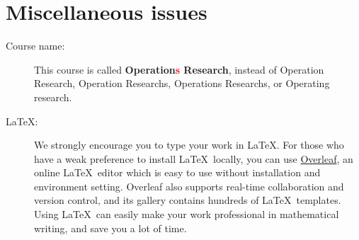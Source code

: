 \documentclass{OR_SolutionTheme}
\begin{document}
\section{Miscellaneous issues}\label{sec:misc}
\begin{description}
    \item[Course name:] This course is called {\bf Operation\textcolor{red}{s} Research},
    instead of Operation Research, Operation Researchs, Operations Researchs, or
    Operating research.
    
    \item[\LaTeX:]
    We strongly encourage you to type your work in \LaTeX.
    For those who have a weak preference to install \LaTeX \ locally,
    you can use \href{https://www.overleaf.com/}{Overleaf}, an
    online \LaTeX \ editor which is easy to use without installation
    and environment setting. Overleaf also supports real-time collaboration and version control, and its gallery contains
    hundreds of \LaTeX \ templates. Using \LaTeX \ can easily 
    make your work professional in mathematical writing, 
    and save you a lot of time.
    
\end{description}
\end{document}
